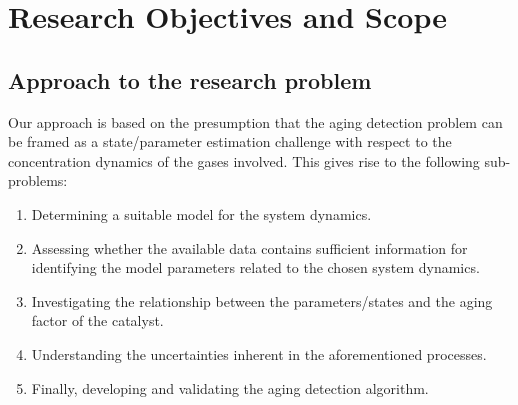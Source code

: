 \section{Research Objectives and Scope}
\subsection{Approach to the research problem}
Our approach is based on the presumption that the aging detection problem can be framed as a state/parameter estimation challenge with respect to the concentration dynamics of the gases involved. This gives rise to the following sub-problems:

\begin{enumerate}
\item Determining a suitable model for the system dynamics.
\item Assessing whether the available data contains sufficient information for identifying the model parameters related to the chosen system dynamics.
\item Investigating the relationship between the parameters/states and the aging factor of the catalyst.
\item Understanding the uncertainties inherent in the aforementioned processes.
\item Finally, developing and validating the aging detection algorithm.
\end{enumerate}


